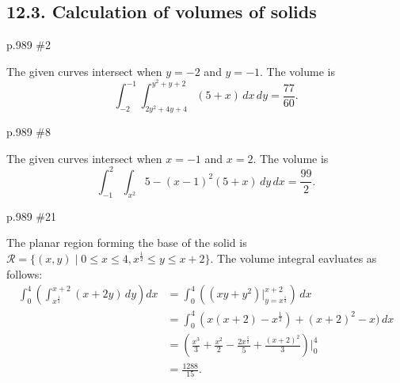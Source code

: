 \subsection{12.3. Calculation of volumes of solids}
\begin{practice}p.989 \#2\end{practice}
\begin{pracsol}
  The given curves intersect when $y=-2$ and $y=-1$. The volume is
  \[\int_{-2}^{-1}\int_{2y^2+4y+4}^{y^2+y+2}(5+x)\,dx\,dy=\frac{77}{60}.\]
\end{pracsol}
\begin{practice}p.989 \#8\end{practice}
\begin{pracsol}
  The given curves intersect when $x=-1$ and $x=2$. The volume is
  \[\int_{-1}^2\int_{x^2}{5-(x-1)^2}(5+x)\,dy\,dx=\frac{99}2.\]
\end{pracsol}
\begin{practice}p.989 \#21\end{practice}
\begin{pracsol}
  The planar region forming the base of the solid is $\mathcal R=\{(x,y)\mid 0\leq x\leq 4, x^{\frac12}\leq y\leq x+2\}$. The volume integral eavluates as follows:
  \[\begin{split}
    \int_0^4\left(\int_{x^{\frac12}}^{x+2}(x+2y)\,dy\right)dx &= \int_0^4\left((xy+y^2)\Big|_{y=x^{\frac12}}^{x+2}\right)\,dx\\
    &= \int_0^4 (x(x+2)-x^{\frac12})+(x+2)^2-x)\,dx\\
    &= \left(\frac{x^3}3+\frac{x^2}2-\frac{2x^{\frac52}}{5}+\frac{(x+2)^2}{3}\right)\Big|_0^4\\
    &=\frac{1288}{15}.
  \end{split}\]
\end{pracsol}


